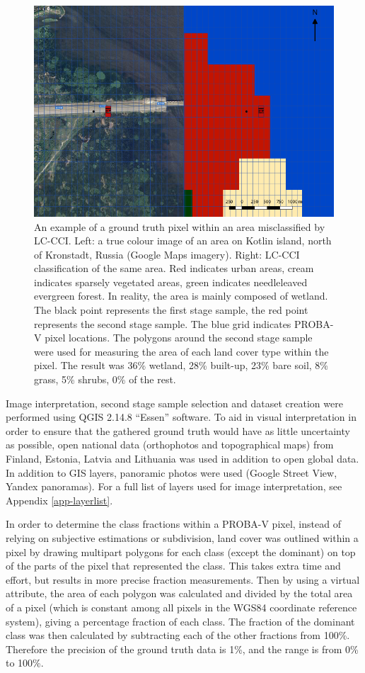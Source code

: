 \documentclass[a4paper,10pt]{book}
\begin{document}
\begin{figure}
 \includegraphics[width=\textwidth]{./thesis-figures/classification-example.png}
 \caption{An example of a ground truth pixel within an area misclassified by LC-CCI. Left: a true colour image of an area on Kotlin island, north of Kronstadt, Russia (Google Maps imagery). Right: LC-CCI classification of the same area. Red indicates urban areas, cream indicates sparsely vegetated areas, green indicates needleleaved evergreen forest. In reality, the area is mainly composed of wetland. The black point represents the first stage sample, the red point represents the second stage sample. The blue grid indicates PROBA-V pixel locations. The polygons around the second stage sample were used for measuring the area of each land cover type within the pixel. The result was 36\% wetland, 28\% built-up, 23\% bare soil, 8\% grass, 5\% shrubs, 0\% of the rest.}
 \label{fig-sampling}
\end{figure}

Image interpretation, second stage sample selection and dataset creation were performed using QGIS 2.14.8 ``Essen'' software. To aid in visual interpretation in order to ensure that the gathered ground truth would have as little uncertainty as possible, open national data (orthophotos and topographical maps) from Finland, Estonia, Latvia and Lithuania was used in addition to open global data. In addition to GIS layers, panoramic photos were used (Google Street View, Yandex panoramas). For a full list of layers used for image interpretation, see Appendix \ref{app-layerlist}.

In order to determine the class fractions within a PROBA-V pixel, instead of relying on subjective estimations or subdivision, land cover was outlined within a pixel by drawing multipart polygons for each class (except the dominant) on top of the parts of the pixel that represented the class. This takes extra time and effort, but results in more precise fraction measurements. Then by using a virtual attribute, the area of each polygon was calculated and divided by the total area of a pixel (which is constant among all pixels in the WGS84 coordinate reference system), giving a percentage fraction of each class. The fraction of the dominant class was then calculated by subtracting each of the other fractions from 100\%. Therefore the precision of the ground truth data is 1\%, and the range is from 0\% to 100\%.
\end{document}
